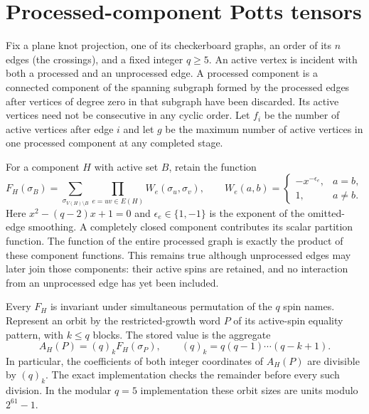 \section{Processed-component Potts tensors}

Fix a plane knot projection, one of its checkerboard graphs, an order of
its $n$ edges (the crossings), and a fixed integer $q\ge5$.  An active
vertex is incident with both a processed and an unprocessed edge.  A
processed component is a connected component of the spanning subgraph
formed by the processed edges after vertices of degree zero in that
subgraph have been discarded.  Its active vertices need not be consecutive
in any cyclic order.  Let $f_i$ be the number of active vertices after
edge $i$ and let $g$ be the maximum number of active vertices in one
processed component at any completed stage.

For a component $H$ with active set $B$, retain the function
\[
 F_H(\sigma_B)=\sum_{\sigma_{V(H)\setminus B}}
       \prod_{e=uv\in E(H)}W_e(\sigma_u,\sigma_v),
 \qquad W_e(a,b)=\begin{cases}-x^{-\epsilon_e},&a=b,\\1,&a\ne b.\end{cases}
\]
Here $x^2-(q-2)x+1=0$ and $\epsilon_e\in\{1,-1\}$ is the exponent of
the omitted-edge smoothing.  A completely closed component contributes
its scalar partition function.  The function of the entire processed
graph is exactly the product of these component functions.  This remains
true although unprocessed edges may later join those components: their
active spins are retained, and no interaction from an unprocessed edge
has yet been included.

Every $F_H$ is invariant under simultaneous permutation of the $q$ spin
names.  Represent an orbit by the restricted-growth word $P$ of its
active-spin equality pattern, with $k\le q$ blocks.  The stored value is
the aggregate
\[
 A_H(P)=(q)_k F_H(\sigma_P),\qquad
 (q)_k=q(q-1)\cdots(q-k+1).
\]
In particular, the coefficients of both integer coordinates of $A_H(P)$
are divisible by $(q)_k$.  The exact implementation checks the remainder
before every such division.  In the modular $q=5$ implementation these
orbit sizes are units modulo $2^{61}-1$.

